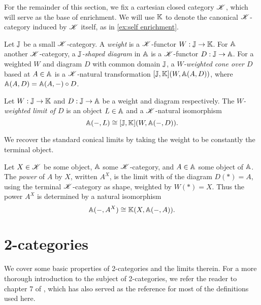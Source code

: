 \documentclass[../thesis.tex]{subfiles}
\begin{document}
For the remainder of this section, we fix a cartesian closed category ${\mathscr{K}}$, which will serve as the base of enrichment.
We will use ${\mathbb{K}}$ to denote the canonical ${\mathscr{K}}$-category induced by ${\mathscr{K}}$ itself, as in \cref{ex:self enrichment}.

\begin{definition}
  Let ${\mathbb{J}}$ be a small ${\mathscr{K}}$-category. A \emph{weight} is a ${\mathscr{K}}$-functor $W : {\mathbb{J}} \to {\mathbb{K}}$. For ${\mathbb{A}}$ another ${\mathscr{K}}$-category,
  a \emph{${\mathbb{J}}$-shaped diagram} in ${\mathbb{A}}$ is a ${\mathscr{K}}$-functor $D : {\mathbb{J}} \to {\mathbb{A}}$. For a weighted $W$ and diagram $D$ with common
  domain ${\mathbb{J}}$, a \emph{$W$-weighted cone over $D$} based at $A \in {\mathbb{A}}$ is a ${\mathscr{K}}$-natural transformation $[{\mathbb{J}}, {\mathbb{K}}](W,
  {\mathbb{A}}(A,D))$, where ${\mathbb{A}}(A,D) = {\mathbb{A}}(A,-) \circ D$.
\end{definition}

\begin{definition}\label{def:weighted limit}
  Let $W : {\mathbb{J}} \to {\mathbb{K}}$ and $D : {\mathbb{J}} \to {\mathbb{A}}$ be a weight and diagram respectively. The \emph{$W$-weighted limit of $D$} is
  an object $L \in {\mathbb{A}}$ and a ${\mathscr{K}}$-natural isomorphism
  \[{\mathbb{A}}(-,L) \cong [{\mathbb{J}},{\mathbb{K}}](W,{\mathbb{A}}(-,D)).\]
\end{definition}

\begin{example}
  We recover the standard conical limits by taking the weight to be constantly the terminal object.
\end{example}

\begin{example}[Cotensors]
  Let $X \in {\mathscr{K}}$ be some object, ${\mathbb{A}}$ some ${\mathscr{K}}$-category, and $A \in {\mathbb{A}}$ some object of ${\mathbb{A}}$. The \emph{power}
  of $A$ by $X$, written $A^X$, is the limit with of the diagram $D(*) = A$, using the terminal ${\mathscr{K}}$-category as shape,
  weighted by $W(*) = X$. Thus the power $A^X$ is determined by a natural isomorphism
  \[{\mathbb{A}}(-,A^X) \cong {\mathbb{K}}(X,{\mathbb{A}}(-,A)).\]
\end{example}

\section{2-categories}
\label{sec:2-cats}
We cover some basic properties of 2-categories and the limits therein. For a more thorough introduction to the subject of
2-categories, we refer the reader to chapter 7 of \cite{borceux1994a}, which has also served as the reference for most of
the definitions used here.
\end{document}
